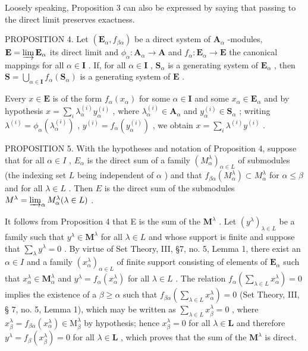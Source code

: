 Loosely speaking, Proposition 3 can also be expressed by saying that passing to the direct limit preserves exactness.

PROPOSITION 4. Let \((\mathbf{E}_{\alpha}, f_{\beta \alpha})\) be a direct system of \(\mathbf{A}_{\alpha}\) -modules, \(\mathbf{E} = \varinjlim \mathbf{E}_{\alpha}\) its direct limit and \(\phi_{\alpha}: \mathbf{A}_{\alpha} \to \mathbf{A}\) and \(f_{\alpha}: \mathbf{E}_{\alpha} \to \mathbf{E}\) the canonical mappings for all \(\alpha \in \mathbf{I}\) . If, for all \(\alpha \in \mathbf{I}\) , \(\mathbf{S}_{\alpha}\) is a generating system of \(\mathbf{E}_{\alpha}\) , then \(\mathbf{S} = \bigcup_{\alpha \in \mathbf{I}} f_{\alpha}(\mathbf{S}_{\alpha})\) is a generating system of \(\mathbf{E}\) .

Every \(x \in \mathbf{E}\) is of the form \(f_{\alpha}(x_{\alpha})\) for some \(\alpha \in \mathbf{I}\) and some \(x_{\alpha} \in \mathbf{E}_{\alpha}\) and by hypothesis \(x = \sum_{i} \lambda_{\alpha}^{(i)} y_{\alpha}^{(i)}\) , where \(\lambda_{\alpha}^{(i)} \in \mathbf{A}_{\alpha}\) and \(y_{\alpha}^{(i)} \in \mathbf{S}_{\alpha}\) ; writing \(\lambda^{(i)} = \phi_{\alpha}(\lambda_{\alpha}^{(i)})\) , \(y^{(i)} = f_{\alpha}(y_{\alpha}^{(i)})\) , we obtain \(x = \sum_{i} \lambda^{(i)} y^{(i)}\) .

PROPOSITION 5. With the hypotheses and notation of Proposition 4, suppose that for all \(\alpha \in I\) , \(E_{\alpha}\) is the direct sum of a family \((M_{\alpha}^{\lambda})_{\alpha \in L}\) of submodules (the indexing set \(L\) being independent of \(\alpha\) ) and that \(f_{\beta \alpha}(M_{\alpha}^{\lambda}) \subset M_{\alpha}^{\lambda}\) for \(\alpha \leqslant \beta\) and for all \(\lambda \in L\) . Then \(E\) is the direct sum of the submodules \(M^{\lambda} = \varinjlim_{\alpha} M_{\alpha}^{\lambda} (\lambda \in L)\) .

It follows from Proposition 4 that E is the sum of the \(\mathbf{M}^{\lambda}\) . Let \((y^{\lambda})_{\lambda \in L}\) be a family such that \(y^{\lambda} \in \mathbf{M}^{\lambda}\) for all \(\lambda \in L\) and whose support is finite and suppose that \(\sum_{\lambda} y^{\lambda} = 0\) . By virtue of Set Theory, III, §7, no. 5, Lemma 1, there exist an \(\alpha \in I\) and a family \((x_{\alpha}^{\lambda})_{\alpha \in L}\) of finite support consisting of elements of \(\mathbf{E}_{\alpha}\) such that \(x_{\alpha}^{\lambda} \in \mathbf{M}_{\alpha}^{\lambda}\) and \(y^{\lambda} = f_{\alpha}(x_{\alpha}^{\lambda})\) for all \(\lambda \in L\) . The relation \(f_{\alpha}\left(\sum_{\lambda \in L} x_{\alpha}^{\lambda}\right) = 0\) implies the existence of a \(\beta \geqslant \alpha\) such that \(f_{\beta \alpha}\left(\sum_{\lambda \in L} x_{\alpha}^{\lambda}\right) = 0\) (Set Theory, III, § 7, no. 5, Lemma 1), which may be written as \(\sum_{\lambda \in L} x_{\beta}^{\lambda} = 0\) , where \(x_{\beta}^{\lambda} = f_{\beta \alpha}(x_{\alpha}^{\lambda}) \in \mathrm{M}_{\beta}^{\lambda}\) by hypothesis; hence \(x_{\beta}^{\lambda} = 0\) for all \(\lambda \in \mathbf{L}\) and therefore \(y^{\lambda} = f_{\beta}(x_{\beta}^{\lambda}) = 0\) for all \(\lambda \in \mathbf{L}\) , which proves that the sum of the \(\mathbf{M}^{\lambda}\) is direct.

